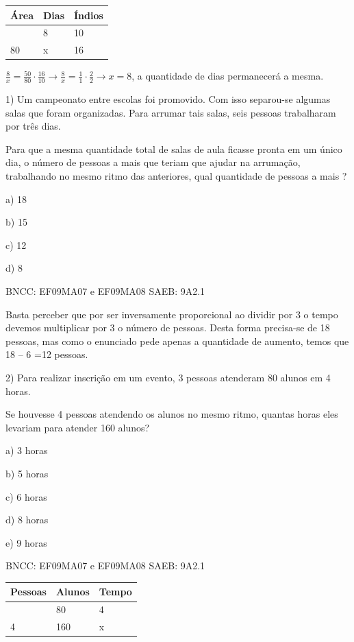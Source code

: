 \begin{escolha}
{{{\begin{escolha}
{\begin{longtable}[]{@{}lll@{}}
\toprule\noalign{}
Área & Dias & Índios \\
\midrule\noalign{}
\endhead
\bottomrule\noalign{}
\endlastfoot
50 & 8 & 10 \\
80 & x & 16 \\
\end{longtable}

\(\frac{8}{x} = \frac{50}{80} \cdot \frac{16}{10} \rightarrow \frac{8}{x} = \frac{1}{1} \cdot \frac{2}{2} \rightarrow x = 8\),
a quantidade de dias permanecerá a mesma.


1) Um campeonato entre escolas foi promovido. Com isso separou-se
algumas salas que foram organizadas. Para arrumar tais salas, seis
pessoas trabalharam por três dias.

Para que a mesma quantidade total de salas de aula ficasse pronta em um
único dia, o número de pessoas a mais que teriam que ajudar na
arrumação, trabalhando no mesmo ritmo das anteriores, qual quantidade de
pessoas a mais ?

a) 18

b) 15

c) 12

d) 8

BNCC: EF09MA07 e EF09MA08 SAEB: 9A2.1

Basta perceber que por ser inversamente proporcional ao dividir por 3 o
tempo devemos multiplicar por 3 o número de pessoas. Desta forma
precisa-se de 18 pessoas, mas como o enunciado pede apenas a quantidade
de aumento, temos que 18 -- 6 =12 pessoas.

2) Para realizar inscrição em um evento, 3 pessoas atenderam 80 alunos
em 4 horas.

Se houvesse 4 pessoas atendendo os alunos no mesmo ritmo, quantas horas
eles levariam para atender 160 alunos?

a) 3 horas

b) 5 horas

c) 6 horas

d) 8 horas

e) 9 horas

BNCC: EF09MA07 e EF09MA08 SAEB: 9A2.1

\begin{longtable}[]{@{}lll@{}}
\toprule\noalign{}
Pessoas & Alunos & Tempo \\
\midrule\noalign{}
\endhead
\bottomrule\noalign{}
\endlastfoot
3 & 80 & 4 \\
4 & 160 & x \\
\end{longtable}

}
\end{escolha}}}}
\end{escolha}
